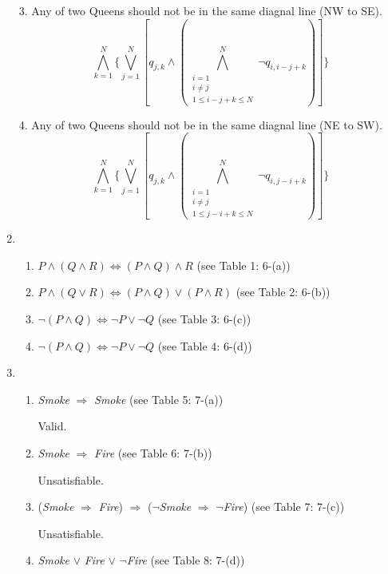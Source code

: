 \documentclass{article}
\begin{document}
\begin{enumerate}
3. Any of two Queens should not be in the same diagnal line (NW to SE).
$$ \bigwedge_{k=1}^{N}\{\bigvee_{j=1}^{N}[q_{j,k} \land (\bigwedge_{\substack{i=1\\i \neq j\\1\leqslant i-j+k \leqslant N}}^{N} \neg q_{i,i-j+k})]\} $$

4. Any of two Queens should not be in the same diagnal line (NE to SW).
$$ \bigwedge_{k=1}^{N}\{\bigvee_{j=1}^{N}[q_{j,k} \land (\bigwedge_{\substack{i=1\\i \neq j\\1\leqslant j-i+k \leqslant N}}^{N} \neg q_{i,j-i+k})]\} $$

\item
\begin{enumerate}
	\item $P \land (Q \land R) \Leftrightarrow (P \land Q) \land R$ (see Table 1: 6-(a))


	\item $P \land (Q \lor R) \Leftrightarrow (P \land Q) \lor (P \land R)$ (see Table 2: 6-(b))


	\item $\neg(P \land Q) \Leftrightarrow \neg P \lor \neg Q$ (see Table 3: 6-(c))


	\item $\neg(P \land Q) \Leftrightarrow \neg P \lor \neg Q$ (see Table 4: 6-(d))

\end{enumerate}



\item
\begin{enumerate}
	\item \textit{Smoke} $\Rightarrow$ \textit{Smoke} (see Table 5: 7-(a))

	Valid.


	\item \textit{Smoke} $\Rightarrow$ \textit{Fire} (see Table 6: 7-(b))
	
	Unsatisfiable.


	\item (\textit{Smoke} $\Rightarrow$ \textit{Fire}) $\Rightarrow$ ($\neg$\textit{Smoke} $\Rightarrow$ $\neg$\textit{Fire}) (see Table 7: 7-(c))

	Unsatisfiable.

	\item \textit{Smoke} $\lor$ \textit{Fire} $\lor$ $\neg$\textit{Fire} (see Table 8: 7-(d))
		

\end{enumerate}
\end{enumerate}
\end{document}
